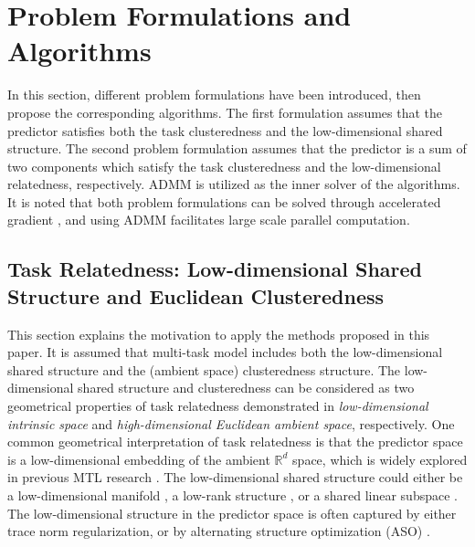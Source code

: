 \documentclass{article}
\newcounter{thm_counter}
\newcounter{lem_counter}
\newcounter{pro_counter}
\newcounter{ass_counter}
\begin{document}
\section{Problem Formulations and Algorithms}

In this section, different problem formulations have been introduced, then propose the corresponding algorithms. The
first formulation assumes that the predictor satisfies both the task clusteredness
and the low-dimensional shared structure. The second problem formulation
assumes that the predictor is a sum of two components which satisfy
the task clusteredness and the low-dimensional relatedness, respectively.
ADMM is utilized as the inner solver of the algorithms.
It is noted that both problem formulations
can  be solved through accelerated gradient \cite{ji2009accelerated},
and using ADMM facilitates large scale parallel computation.


\subsection{Task Relatedness: Low-dimensional Shared Structure and Euclidean
Clusteredness}


This section explains the motivation to apply the methods proposed
in this paper. It is assumed that multi-task model includes
both the low-dimensional shared structure and the (ambient space) clusteredness
structure. The low-dimensional shared structure and clusteredness
can be considered as two geometrical properties of task relatedness
demonstrated in \emph{low-dimensional  intrinsic space}
and \emph{high-dimensional Euclidean ambient space}, respectively.
One common geometrical interpretation of task relatedness is that
the predictor space is a low-dimensional embedding of the ambient
$\mathbb{R}^{d}$ space, which is widely explored in previous MTL
research \cite{cmtl:nips2011:zhou2011clustered,mtl:aso:ando2005framework}.
The low-dimensional shared structure could either be a low-dimensional
manifold \cite{mtl:nips2010:manifold:agarwal2010learning}, a low-rank
structure \cite{ji2009accelerated}, or a shared linear subspace \cite{mtl:aso:ando2005framework}.
The low-dimensional structure in the predictor space is often captured
by either trace norm regularization, or by alternating structure optimization
(ASO) \cite{mtl:aso:ando2005framework}. 
\end{document}
